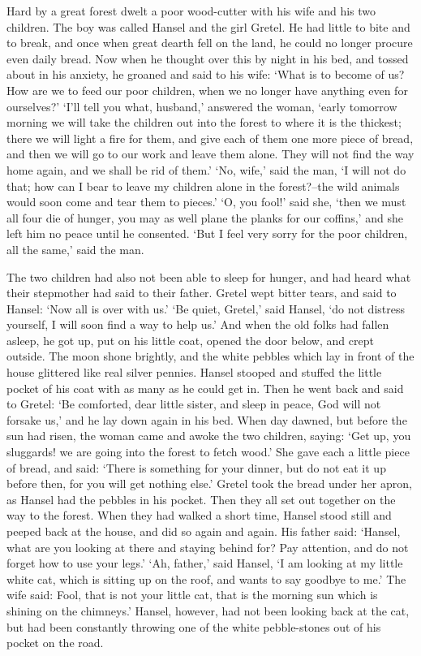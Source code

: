 \documentclass[oneside,11pt]{memoir} %
\begin{document}
	Hard by a great forest dwelt a poor wood-cutter with his wife and his two children. The boy was called Hansel and the girl Gretel. He had little to bite and to break, and once when great dearth fell on the land, he could no longer procure even daily bread. Now when he thought over this by night in his bed, and tossed about in his anxiety, he groaned and said to his wife: `What is to become of us? How are we to feed our poor children, when we no longer have anything even for ourselves?' `I'll tell you what, husband,' answered the woman, `early tomorrow morning we will take the children out into the forest to where it is the thickest; there we will light a fire for them, and give each of them one more piece of bread, and then we will go to our work and leave them alone. They will not find the way home again, and we shall be rid of them.' `No, wife,' said the man, `I will not do that; how can I bear to leave my children alone in the forest?--the wild animals would soon come and tear them to pieces.' `O, you fool!' said she, `then we must all four die of hunger, you may as well plane the planks for our coffins,' and she left him no peace until he consented. `But I feel very sorry for the poor children, all the same,' said the man.
	
	The two children had also not been able to sleep for hunger, and had heard what their stepmother had said to their father. Gretel wept bitter tears, and said to Hansel: `Now all is over with us.' `Be quiet, Gretel,' said Hansel, `do not distress yourself, I will soon find a way to help us.' And when the old folks had fallen asleep, he got up, put on his little coat, opened the door below, and crept outside. The moon shone brightly, and the white pebbles which lay in front of the house glittered like real silver pennies. Hansel stooped and stuffed the little pocket of his coat with as many as he could get in. Then he went back and said to Gretel: `Be comforted, dear little sister, and sleep in peace, God will not forsake us,' and he lay down again in his bed. When day dawned, but before the sun had risen, the woman came and awoke the two children, saying: `Get up, you sluggards! we are going into the forest to fetch wood.' She gave each a little piece of bread, and said: `There is something for your dinner, but do not eat it up before then, for you will get nothing else.' Gretel took the bread under her apron, as Hansel had the pebbles in his pocket. Then they all set out together on the way to the forest. When they had walked a short time, Hansel stood still and peeped back at the house, and did so again and again. His father said: `Hansel, what are you looking at there and staying behind for? Pay attention, and do not forget how to use your legs.' `Ah, father,' said Hansel, `I am looking at my little white cat, which is sitting up on the roof, and wants to say goodbye to me.' The wife said: Fool, that is not your little cat, that is the morning sun which is shining on the chimneys.' Hansel, however, had not been looking back at the cat, but had been constantly throwing one of the white pebble-stones out of his pocket on the road.
	
\end{document}
